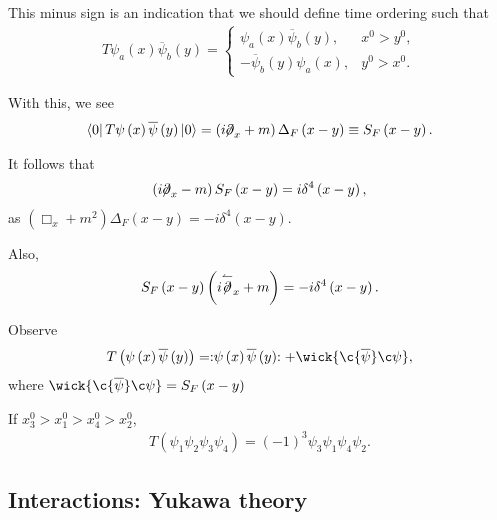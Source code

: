 This minus sign is an indication that we should define time ordering such that
\begin{align}
    T \psi_a \left( x \right) \overline{\psi}_b \left( y \right) = \begin{cases}
        \psi_a \left( x \right) \overline{\psi}_b \left( y \right), & x^{0} > y^{0}, \\
        -\overline{\psi}_b \left( y \right) \psi_a \left( x \right) , & y^{0} > x^{0}.
    \end{cases}
\end{align}

With this, we see
\begin{align}
    \bra{0} T \psi \left( x \right) \overline{\psi}\left( y \right) \ket{0} = \left( i\fbs{\partial}_x + m \right) \Delta_F \left( x - y \right) \equiv S_F \left( x - y \right) 
.\end{align}

It follows that
\begin{align}
    \left( i  \fbs{\partial}_x - m\right) S_F \left( x - y \right) = i \delta^{4}\left( x - y \right) 
,\end{align}
as $\left( \Box_x + m^2 \right) \Delta_F \left( x-  y \right) = -i \delta^{4} \left( x - y \right) $.

Also,
\begin{align}
    S_F \left( x - y \right)\left( i  \overset{\leftharpoonup}{\fbs{\partial}}_x + m\right)  = -i \delta^{4}\left( x - y \right) 
.\end{align}

\begin{theorem}
    Observe
    \begin{align}
        T \left( \psi \left( x \right) \overline{\psi}\left( y \right)  \right) = \nord{\psi \left( x \right) \overline{\psi}\left( y \right) } + \wick{ \c {\overline{\psi}} \c \psi}
    ,\end{align}
    where $\wick{ \c {\overline{\psi}} \c \psi} = S_F \left( x - y \right) $
\end{theorem}

\begin{note}
    If $x^{0}_3 > x^{0}_1 > x^{0}_4 > x_2^{0}$,
    \begin{align}
        T \left( \psi_1 \psi_2 \psi_3 \psi_4 \right) = \left( -1 \right)^{3} \psi_3 \psi_1 \psi_4\psi_2
    .\end{align}
\end{note}

\subsection{Interactions: Yukawa theory}

